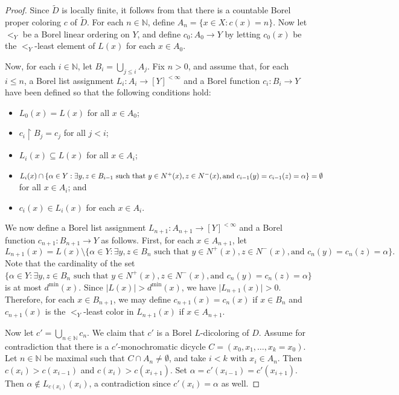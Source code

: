 \documentclass[psamsfonts]{amsart}
\theoremstyle{definition}
\newcommand{\N}{\mathbb N}
\theoremstyle{remark}
\numberwithin{equation}{section}
\begin{document}
\begin{proof}
    Since $\tilde{D}$ is locally finite, it follows from \cite[Proposition~4.3]{kst1999} that there is a countable Borel proper coloring $c$ of $\tilde{D}$. For each $n \in \N$, define $A_n = \{x \in X : c(x) = n \}$. Now let $<_Y$ be a Borel linear ordering on $Y$, and define $c_0 : A_0 \to Y$ by letting $c_0(x)$ be the $<_Y$-least element of $L(x)$ for each $x \in A_0$.

    Now, for each $i \in \N$, let $B_i = \bigcup_{j \leq i} A_j$. Fix $n > 0$, and assume that, for each $i \leq n$, a Borel list assignment $L_i : A_i \to [Y]^{< \infty}$ and a Borel function $c_i : B_i \to Y$ have been defined so that the following conditions hold:
    \begin{itemize}
        \item $L_0(x) = L(x)$ for all $x \in A_0$;
        \item $c_i \restriction B_j = c_j$ for all $j < i$;
        \item $L_i(x) \subseteq L(x)$ for all $x \in A_i$;
        \item $L_i(x) \cap \{\alpha \in Y : \exists y, z \in B_{i - 1} \text{ such that } y \in N^+(x), z \in N^-(x), \text{and } \\ c_{i - 1}(y) = c_{i - 1}(z) = \alpha \} = \emptyset$ for all $x \in A_i$; and
        \item $c_i(x) \in L_i(x)$ for each $x \in A_i$.
    \end{itemize}
    We now define a Borel list assignment $L_{n + 1} : A_{n + 1} \to [Y]^{< \infty}$ and a Borel function $c_{n + 1} : B_{n + 1} \to Y$ as follows. First, for each $x \in A_{n + 1}$, let
    $$L_{n + 1}(x) = L(x) \setminus \{\alpha \in Y : \exists y, z \in B_n \text{ such that } y \in N^+(x), z \in N^-(x), \text{and } c_n(y) = c_n(z) = \alpha \}.$$
    Note that the cardinality of the set $\{\alpha \in Y : \exists y, z \in B_n \text{ such that } y \in N^+(x), z \in N^-(x), \text{and } c_n(y) = c_n(z) = \alpha \}$ is at most $d^{\min}(x)$. Since $\vert L(x) \vert > d^{\min}(x)$, we have $\vert L_{n + 1}(x) \vert > 0$. Therefore, for each $x \in B_{n + 1}$, we may define $c_{n + 1}(x) = c_n(x)$ if $x \in B_n$ and $c_{n + 1}(x)$ is the $<_Y$-least color in $L_{n + 1}(x)$ if $x \in A_{n + 1}$.

    Now let $c' = \bigcup_{n \in \N} c_n$. We claim that $c'$ is a Borel $L$-dicoloring of $D$. Assume for contradiction that there is a $c'$-monochromatic dicycle $C = (x_0, x_1, \dots, x_k = x_0)$. Let $n \in \N$ be maximal such that $C \cap A_n \neq \emptyset$, and take $i < k$ with $x_i \in A_n$. Then $c(x_i) > c(x_{i - 1})$ and $c(x_i) > c(x_{i + 1})$. Set $\alpha = c'(x_{i - 1}) = c'(x_{i + 1})$. Then $\alpha \notin L_{c(x_i)}(x_i)$, a contradiction since $c'(x_i) = \alpha$ as well.
\end{proof}
\end{document}
